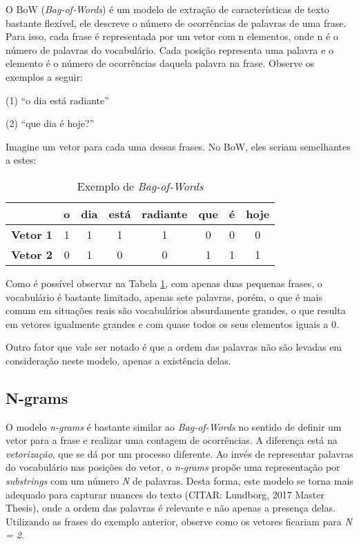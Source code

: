 O BoW (\textit{Bag-of-Words}) é um modelo de extração de características de texto bastante flexível, ele descreve o número de ocorrências de palavras de uma frase. Para isso, cada frase é representada por um vetor com n elementos, onde n é o número de palavras do vocabulário. Cada posição representa uma palavra e o elemento é o número de ocorrências daquela palavra na frase. Observe os exemplos a seguir:

\begin{samepage}
(1) “o dia está radiante”

\nopagebreak

(2) “que dia é hoje?”
\end{samepage}

Imagine um vetor para cada uma dessas frases. No BoW, eles seriam semelhantes a estes:

\begin{center}
\begin{table}[htbp]
\centering
\begin{tabular}{c|ccccccc}
 & \textbf{o} & \textbf{dia} & \textbf{está} & \textbf{radiante} & \textbf{que} & \textbf{é} & \textbf{hoje} \\ \hline
\textbf{Vetor 1} & 1 & 1 & 1 & 1 & 0 & 0 & 0 \\
\textbf{Vetor 2} & 0 & 1 & 0 & 0 & 1 & 1 & 1 
\end{tabular}
\caption{Exemplo de \textit{Bag-of-Words}}
\label{bow}
\end{table}
\end{center}

Como é possível observar na Tabela \ref{bow}, com apenas duas pequenas frases, o vocabulário é bastante limitado, apenas sete palavras, porém, o que é mais comum em situações reais são vocabulários absurdamente grandes, o que resulta em vetores igualmente grandes e com quase todos os seus elementos iguais a 0.

Outro fator que vale ser notado é que a ordem das palavras não são levadas em consideração neste modelo, apenas a existência delas.

\subsection{N-grams}

O modelo \textit{n-grams} é bastante similar ao \textit{Bag-of-Words} no sentido de definir um vetor para a frase e realizar uma contagem de ocorrências. A diferença está na \textit{vetorização}, que se dá por um processo diferente. Ao invés de representar palavras do vocabulário nas posições do vetor, o \textit{n-grams} propõe uma representação por \textit{substrings}  com um número \textit{N} de palavras. Desta forma, este modelo se torna mais adequado para capturar nuances do texto (CITAR: Lundborg, 2017 Master Thesis), onde a ordem das palavras é relevante e não apenas a presença delas. Utilizando as frases do exemplo anterior, observe como os vetores ficariam para \textit{N = 2}.

